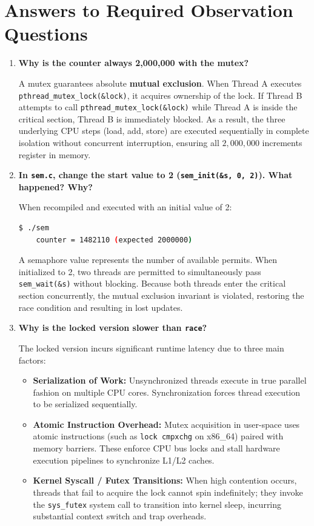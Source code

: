 \documentclass[12pt,a4paper]{report}
\numberwithin{equation}{chapter}
\numberwithin{figure}{chapter}
\numberwithin{table}{chapter}
\begin{document}
\section{Answers to Required Observation Questions}
\begin{enumerate}
    \item \textbf{Why is the counter always 2,000,000 with the mutex?}
    
    A mutex guarantees absolute \textbf{mutual exclusion}. When Thread A executes \texttt{pthread\_mutex\_lock(\&lock)}, it acquires ownership of the lock. If Thread B attempts to call \texttt{pthread\_mutex\_lock(\&lock)} while Thread A is inside the critical section, Thread B is immediately blocked. As a result, the three underlying CPU steps (load, add, store) are executed sequentially in complete isolation without concurrent interruption, ensuring all $2{,}000{,}000$ increments register in memory.

    \item \textbf{In \texttt{sem.c}, change the start value to 2 (\texttt{sem\_init(\&s, 0, 2)}). What happened? Why?}
    
    When recompiled and executed with an initial value of 2:
    \begin{lstlisting}[language=bash]
    $ ./sem
    counter = 1482110 (expected 2000000)
    \end{lstlisting}
    A semaphore value represents the number of available permits. When initialized to 2, two threads are permitted to simultaneously pass \texttt{sem\_wait(\&s)} without blocking. Because both threads enter the critical section concurrently, the mutual exclusion invariant is violated, restoring the race condition and resulting in lost updates.

    \item \textbf{Why is the locked version slower than \texttt{race}?}
    
    The locked version incurs significant runtime latency due to three main factors:
    \begin{itemize}
        \item \textbf{Serialization of Work:} Unsynchronized threads execute in true parallel fashion on multiple CPU cores. Synchronization forces thread execution to be serialized sequentially.
        \item \textbf{Atomic Instruction Overhead:} Mutex acquisition in user-space uses atomic instructions (such as \texttt{lock cmpxchg} on x86\_64) paired with memory barriers. These enforce CPU bus locks and stall hardware execution pipelines to synchronize L1/L2 caches.
        \item \textbf{Kernel Syscall / Futex Transitions:} When high contention occurs, threads that fail to acquire the lock cannot spin indefinitely; they invoke the \texttt{sys\_futex} system call to transition into kernel sleep, incurring substantial context switch and trap overheads.
    \end{itemize}
\end{enumerate}
\end{document}
